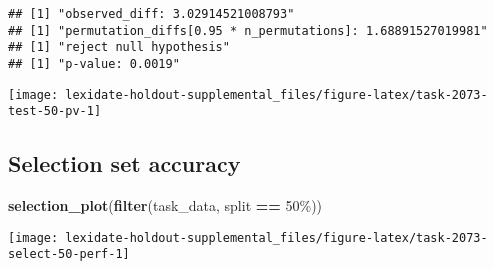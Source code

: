 \documentclass[
]{book}
\newenvironment{Shaded}{\begin{snugshade}}{\end{snugshade}}
\newcommand{\AttributeTok}[1]{\textcolor[rgb]{0.13,0.29,0.53}{#1}}
\newcommand{\DecValTok}[1]{\textcolor[rgb]{0.00,0.00,0.81}{#1}}
\newcommand{\FunctionTok}[1]{\textcolor[rgb]{0.13,0.29,0.53}{\textbf{#1}}}
\newcommand{\NormalTok}[1]{#1}
\newcommand{\OtherTok}[1]{\textcolor[rgb]{0.56,0.35,0.01}{#1}}
\newcommand{\SpecialCharTok}[1]{\textcolor[rgb]{0.81,0.36,0.00}{\textbf{#1}}}
\newcommand{\StringTok}[1]{\textcolor[rgb]{0.31,0.60,0.02}{#1}}
\begin{document}
\begin{Shaded}
\end{Shaded}

\begin{verbatim}
## [1] "observed_diff: 3.02914521008793"
## [1] "permutation_diffs[0.95 * n_permutations]: 1.68891527019981"
## [1] "reject null hypothesis"
## [1] "p-value: 0.0019"
\end{verbatim}

\texttt{[image: lexidate-holdout-supplemental\_files/figure-latex/task-2073-test-50-pv-1]}

\hypertarget{selection-set-accuracy-42}{%
\subsection{Selection set accuracy}\label{selection-set-accuracy-42}}

\begin{Shaded}
\begin{Highlighting}[]
\FunctionTok{selection\_plot}\NormalTok{(}\FunctionTok{filter}\NormalTok{(task\_data, split }\SpecialCharTok{==} \StringTok{\textquotesingle{}50\%\textquotesingle{}}\NormalTok{))}
\end{Highlighting}
\end{Shaded}

\texttt{[image: lexidate-holdout-supplemental\_files/figure-latex/task-2073-select-50-perf-1]}
\end{document}
